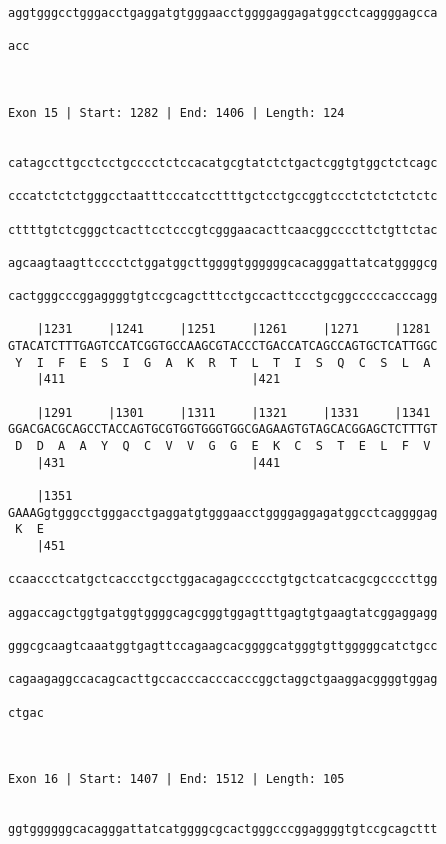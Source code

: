 \documentclass{article}
\begin{document}
\begin{Verbatim}
aggtgggcctgggacctgaggatgtgggaacctggggaggagatggcctcaggggagcca
                                                            
acc
   
   
 
Exon 15 | Start: 1282 | End: 1406 | Length: 124


catagccttgcctcctgcccctctccacatgcgtatctctgactcggtgtggctctcagc
                                                            
cccatctctctgggcctaatttcccatccttttgctcctgccggtccctctctctctctc
                                                            
cttttgtctcgggctcacttcctcccgtcgggaacacttcaacggccccttctgttctac
                                                            
agcaagtaagttcccctctggatggcttggggtggggggcacagggattatcatggggcg
                                                            
cactgggcccggaggggtgtccgcagctttcctgccacttccctgcggcccccacccagg
                                                            
    |1231     |1241     |1251     |1261     |1271     |1281 
GTACATCTTTGAGTCCATCGGTGCCAAGCGTACCCTGACCATCAGCCAGTGCTCATTGGC
 Y  I  F  E  S  I  G  A  K  R  T  L  T  I  S  Q  C  S  L  A 
    |411                          |421                      
  
    |1291     |1301     |1311     |1321     |1331     |1341 
GGACGACGCAGCCTACCAGTGCGTGGTGGGTGGCGAGAAGTGTAGCACGGAGCTCTTTGT
 D  D  A  A  Y  Q  C  V  V  G  G  E  K  C  S  T  E  L  F  V 
    |431                          |441                      
  
    |1351                                                   
GAAAGgtgggcctgggacctgaggatgtgggaacctggggaggagatggcctcaggggag
 K  E                                                       
    |451
  
ccaaccctcatgctcaccctgcctggacagagccccctgtgctcatcacgcgccccttgg

aggaccagctggtgatggtggggcagcgggtggagtttgagtgtgaagtatcggaggagg

gggcgcaagtcaaatggtgagttccagaagcacggggcatgggtgttgggggcatctgcc

cagaagaggccacagcacttgccacccacccacccggctaggctgaaggacggggtggag

ctgac
     

 
Exon 16 | Start: 1407 | End: 1512 | Length: 105


ggtggggggcacagggattatcatggggcgcactgggcccggaggggtgtccgcagcttt


\end{Verbatim}
\end{document}
